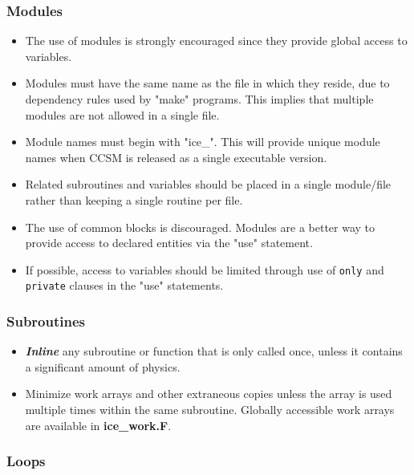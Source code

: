 \subsubsection*{Modules}

\begin{itemize}
  \item The use of modules is strongly encouraged since they provide global
        access to variables.
  \item Modules must have the same name as the file in which they reside,
        due to dependency rules used by "make" programs.        
        This implies that multiple modules are not allowed in a single file.
  \item Module names must begin with "ice\_".  This will provide unique
        module names when CCSM is released as a single executable version.
  \item Related subroutines and variables should be placed in
       a single module/file rather than keeping a single routine per file.
  \item The use of common blocks is discouraged.  Modules are a better
        way to provide access to declared entities via the "use" statement.
  \item If possible, access to variables should be limited through use of
        {\tt only} and {\tt private} clauses in the "use" statements.
\end{itemize}

\subsubsection*{Subroutines}
\begin{itemize}
  \item {\bf \textsl{Inline}} any subroutine or function that is only called once, unless
        it contains a significant amount of physics.
  \item Minimize work arrays and other extraneous copies unless the array is
        used multiple times within the same subroutine.  Globally accessible
        work arrays are available in {\bf ice\_work.F}.
\end{itemize}
\subsubsection*{Loops}

